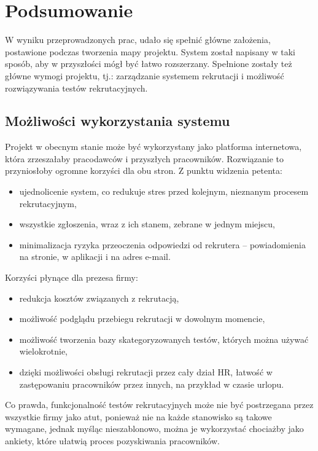 \documentclass[twoside]{projektInzynierskiMS}
\numberwithin{figure}{section}
\begin{document}
\section{Podsumowanie}
W wyniku przeprowadzonych prac, udało się spełnić główne założenia, postawione podczas tworzenia mapy projektu. System został napisany w taki sposób, aby w przyszłości mógł być łatwo rozszerzany. Spełnione zostały też główne wymogi projektu, tj.: zarządzanie systemem rekrutacji i możliwość rozwiązywania testów rekrutacyjnych.

\subsection{Możliwości wykorzystania systemu}
Projekt w obecnym stanie może być wykorzystany jako platforma internetowa, która zrzeszałaby pracodawców i przyszłych pracowników. Rozwiązanie to przyniosłoby ogromne korzyści dla obu stron. Z punktu widzenia petenta:
\begin{itemize}
    \item ujednolicenie system, co redukuje stres przed kolejnym, nieznanym procesem rekrutacyjnym,
    \item wszystkie zgłoszenia, wraz z ich stanem, zebrane w jednym miejscu,
    \item minimalizacja ryzyka przeoczenia odpowiedzi od rekrutera -- powiadomienia na stronie, w aplikacji i na adres e-mail.
\end{itemize}
Korzyści płynące dla prezesa firmy:
\begin{itemize}
    \item redukcja kosztów związanych z rekrutacją,
    \item możliwość podglądu przebiegu rekrutacji w dowolnym momencie,
    \item możliwość tworzenia bazy skategoryzowanych testów, których można używać wielokrotnie,
    \item dzięki możliwości obsługi rekrutacji przez cały dział HR, łatwość w zastępowaniu pracowników przez innych, na przykład w czasie urlopu.
\end{itemize}
Co prawda, funkcjonalność testów rekrutacyjnych może nie być postrzegana przez wszystkie firmy jako atut, ponieważ nie na każde stanowisko są takowe wymagane, jednak myśląc nieszablonowo, można je wykorzystać chociażby jako ankiety, które ułatwią proces pozyskiwania pracowników. 
\end{document}
